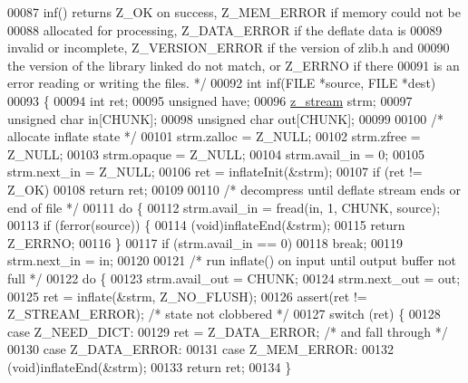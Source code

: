 \begin{DoxyCode}
00087 \textcolor{comment}{   inf() returns Z\_OK on success, Z\_MEM\_ERROR if memory could not be}
00088 \textcolor{comment}{   allocated for processing, Z\_DATA\_ERROR if the deflate data is}
00089 \textcolor{comment}{   invalid or incomplete, Z\_VERSION\_ERROR if the version of zlib.h and}
00090 \textcolor{comment}{   the version of the library linked do not match, or Z\_ERRNO if there}
00091 \textcolor{comment}{   is an error reading or writing the files. */}
00092 \textcolor{keywordtype}{int} inf(FILE *source, FILE *dest)
00093 \{
00094     \textcolor{keywordtype}{int} ret;
00095     \textcolor{keywordtype}{unsigned} have;
00096     \hyperlink{structz__stream__s}{z\_stream} strm;
00097     \textcolor{keywordtype}{unsigned} \textcolor{keywordtype}{char} in[CHUNK];
00098     \textcolor{keywordtype}{unsigned} \textcolor{keywordtype}{char} out[CHUNK];
00099 
00100     \textcolor{comment}{/* allocate inflate state */}
00101     strm.zalloc = Z\_NULL;
00102     strm.zfree = Z\_NULL;
00103     strm.opaque = Z\_NULL;
00104     strm.avail\_in = 0;
00105     strm.next\_in = Z\_NULL;
00106     ret = inflateInit(&strm);
00107     \textcolor{keywordflow}{if} (ret != Z\_OK)
00108         \textcolor{keywordflow}{return} ret;
00109 
00110     \textcolor{comment}{/* decompress until deflate stream ends or end of file */}
00111     \textcolor{keywordflow}{do} \{
00112         strm.avail\_in = fread(in, 1, CHUNK, source);
00113         \textcolor{keywordflow}{if} (ferror(source)) \{
00114             (void)inflateEnd(&strm);
00115             \textcolor{keywordflow}{return} Z\_ERRNO;
00116         \}
00117         \textcolor{keywordflow}{if} (strm.avail\_in == 0)
00118             \textcolor{keywordflow}{break};
00119         strm.next\_in = in;
00120 
00121         \textcolor{comment}{/* run inflate() on input until output buffer not full */}
00122         \textcolor{keywordflow}{do} \{
00123             strm.avail\_out = CHUNK;
00124             strm.next\_out = out;
00125             ret = inflate(&strm, Z\_NO\_FLUSH);
00126             assert(ret != Z\_STREAM\_ERROR);  \textcolor{comment}{/* state not clobbered */}
00127             \textcolor{keywordflow}{switch} (ret) \{
00128             \textcolor{keywordflow}{case} Z\_NEED\_DICT:
00129                 ret = Z\_DATA\_ERROR;     \textcolor{comment}{/* and fall through */}
00130             \textcolor{keywordflow}{case} Z\_DATA\_ERROR:
00131             \textcolor{keywordflow}{case} Z\_MEM\_ERROR:
00132                 (void)inflateEnd(&strm);
00133                 \textcolor{keywordflow}{return} ret;
00134             \}

\end{DoxyCode}
